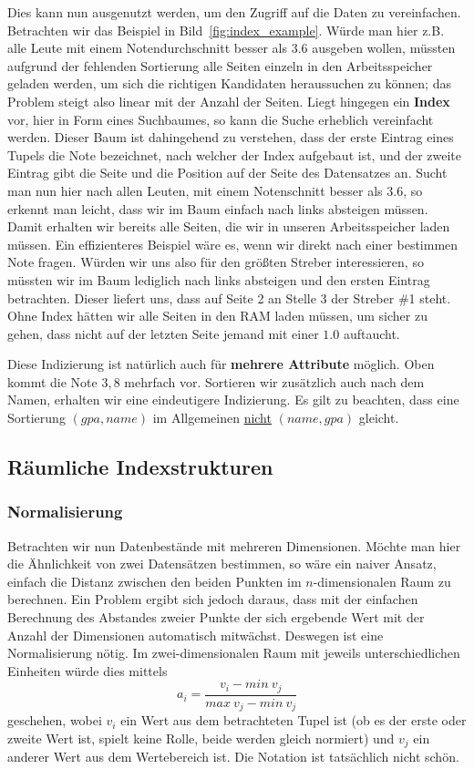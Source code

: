 Dies kann nun ausgenutzt werden, um den Zugriff auf die Daten zu vereinfachen. Betrachten
wir das Beispiel in Bild~\ref{fig:index_example}. Würde man hier z.B. alle Leute
mit einem Notendurchschnitt besser als \(3.6\) ausgeben wollen, müssten aufgrund der
fehlenden Sortierung alle Seiten einzeln in den Arbeitsspeicher geladen werden,
um sich die richtigen Kandidaten heraussuchen zu können; das Problem steigt also
linear mit der Anzahl der Seiten. Liegt hingegen ein
\textbf{Index} vor, hier in Form eines Suchbaumes, so kann die Suche erheblich
vereinfacht werden. Dieser Baum ist dahingehend zu verstehen, dass der erste
Eintrag eines Tupels die Note bezeichnet, nach welcher der Index aufgebaut ist,
und der zweite Eintrag gibt die Seite und die Position auf der Seite des Datensatzes
an. Sucht man nun hier nach allen Leuten, mit einem Notenschnitt besser als \(3.6\),
so erkennt man leicht, dass wir im Baum einfach nach links absteigen müssen. Damit
erhalten wir bereits alle Seiten, die wir in unseren Arbeitsspeicher laden müssen.
Ein effizienteres Beispiel wäre es, wenn wir direkt nach einer bestimmen Note fragen.
Würden wir uns also für den größten Streber interessieren, so müssten wir im Baum
lediglich nach links absteigen und den ersten Eintrag betrachten. Dieser liefert uns,
dass auf Seite 2 an Stelle 3 der Streber \#1 steht. Ohne Index hätten wir alle
Seiten in den RAM laden müssen, um sicher zu gehen, dass nicht auf der letzten
Seite jemand mit einer \(1.0\) auftaucht.

Diese Indizierung ist natürlich auch für \textbf{mehrere Attribute} möglich.
Oben kommt die Note \(3,8\) mehrfach vor. Sortieren wir zusätzlich auch nach dem
Namen, erhalten wir eine eindeutigere Indizierung. Es gilt zu beachten, dass
eine Sortierung \((gpa, name)\) im Allgemeinen \underline{nicht} \((name, gpa)\)
gleicht.

\subsection{Räumliche Indexstrukturen}
\subsubsection{Normalisierung}
Betrachten wir nun Datenbestände mit mehreren Dimensionen. Möchte man hier die
Ähnlichkeit von zwei Datensätzen bestimmen, so wäre ein naiver Ansatz, einfach
die Distanz zwischen den beiden Punkten im \(n\)-dimensionalen Raum zu berechnen.
Ein Problem ergibt sich jedoch daraus, dass mit der einfachen Berechnung des Abstandes
zweier Punkte der sich ergebende Wert mit der Anzahl der Dimensionen automatisch
mitwächst. Deswegen ist eine Normalisierung nötig. Im zwei-dimensionalen Raum mit
jeweils unterschiedlichen Einheiten würde dies mittels
\[
	a_i = \frac{v_i - min\ v_j}{max\ v_j - min\ v_j}
\]
geschehen, wobei \(v_i\) ein Wert aus dem betrachteten Tupel ist (ob es der erste
oder zweite Wert ist, spielt keine Rolle, beide werden gleich normiert) und \(v_j\)
ein anderer Wert aus dem Wertebereich ist. Die Notation ist tatsächlich nicht schön.

